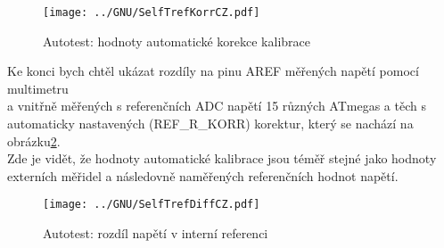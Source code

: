 \begin{figure}[H]
  \centering
  \texttt{[image: ../GNU/SelfTrefKorrCZ.pdf]}
  \caption{Autotest: hodnoty automatické korekce kalibrace}
  \label{fig:SelfTrefKorr}
\end{figure}

 Ke konci bych chtěl ukázat rozdíly na pinu AREF měřených napětí pomocí multimetru\\
 a vnitřně měřených s referenčních ADC napětí 15 různých ATmegas a těch s automaticky nastavených (REF\_R\_KORR)  korektur, který se nachází na obrázku\ref{fig:SelfTrefDiff}.
\\Zde je vidět, že hodnoty automatické kalibrace jsou téměř stejné jako hodnoty externích měřidel a
následovně naměřených referenčních hodnot napětí.
\begin{figure}[H]
  \centering
  \texttt{[image: ../GNU/SelfTrefDiffCZ.pdf]}
  \caption{Autotest: rozdíl napětí v interní referenci}
  \label{fig:SelfTrefDiff}
\end{figure}

